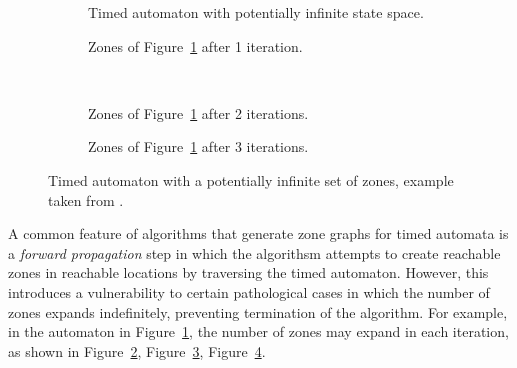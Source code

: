 \documentclass[a4paper]{llncs}
\begin{document}
\begin{figure}
  \centering
  \begin{subfigure}[b]{0.5\textwidth}
    \centering
    \def\svgwidth{\columnwidth}
    
    \caption{Timed automaton with potentially infinite state space.}
    \label{breaking2}
  \end{subfigure}%

  \begin{subfigure}[b]{0.3\textwidth}
    \centering
    \def\svgwidth{\columnwidth}
    
    \caption{Zones of Figure~\ref{breaking2} after 1 iteration.}
    \label{breaking2-zones01}
  \end{subfigure}
  ~ %
  \begin{subfigure}[b]{0.6\textwidth}
    \centering
    \def\svgwidth{\columnwidth}
    
    \caption{Zones of Figure~\ref{breaking2} after 2 iterations.}
    \label{breaking2-zones02}
  \end{subfigure}

  \begin{subfigure}[b]{\textwidth}
    \centering
    \def\svgwidth{0.9\columnwidth}
    
    \caption{Zones of Figure~\ref{breaking2} after 3 iterations.}
    \label{breaking2-zones03}
  \end{subfigure}
  \caption{Timed automaton with a potentially infinite
    set of zones, example taken from \cite{Behrmann03staticguard}.}
  \label{breaking2withzones}
\end{figure}

A common feature of algorithms that generate zone graphs for timed
automata is a \emph{forward propagation} step in which the algorithsm attempts to
create reachable zones in reachable locations by traversing the timed
automaton. However, this introduces a vulnerability to certain
pathological cases in which the number of zones expands indefinitely,
preventing termination of the algorithm. For example, in the automaton in
Figure~\ref{breaking2}, the number of zones may expand in each
iteration, as shown in Figure~\ref{breaking2-zones01},
Figure~\ref{breaking2-zones02}, Figure~\ref{breaking2-zones03}.
\end{document}
